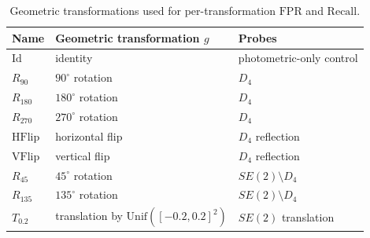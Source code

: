 \documentclass{article}
\begin{document}
\begin{table}[h]
\centering
\small
\caption{Geometric transformations used for per-transformation $\mathrm{FPR}$ and $\mathrm{Recall}$.}
\label{tab:geom-strata}
\begin{tabular}{@{}lll@{}}
\toprule
Name & Geometric transformation $g$ & Probes \\
\midrule
$\mathrm{Id}$       & identity                                    & photometric-only control \\
$R_{90}$            & $90^\circ$ rotation                         & $D_4$ \\
$R_{180}$           & $180^\circ$ rotation                        & $D_4$ \\
$R_{270}$           & $270^\circ$ rotation                        & $D_4$ \\
$\mathrm{HFlip}$    & horizontal flip                             & $D_4$ reflection \\
$\mathrm{VFlip}$    & vertical flip                               & $D_4$ reflection \\
$R_{45}$            & $45^\circ$ rotation                         & $SE(2)\setminus D_4$ \\
$R_{135}$           & $135^\circ$ rotation                        & $SE(2)\setminus D_4$ \\
$T_{0.2}$           & translation by $\mathrm{Unif}([-0.2, 0.2]^2)$ & $SE(2)$ translation \\
\bottomrule
\end{tabular}
\end{table}
\end{document}
